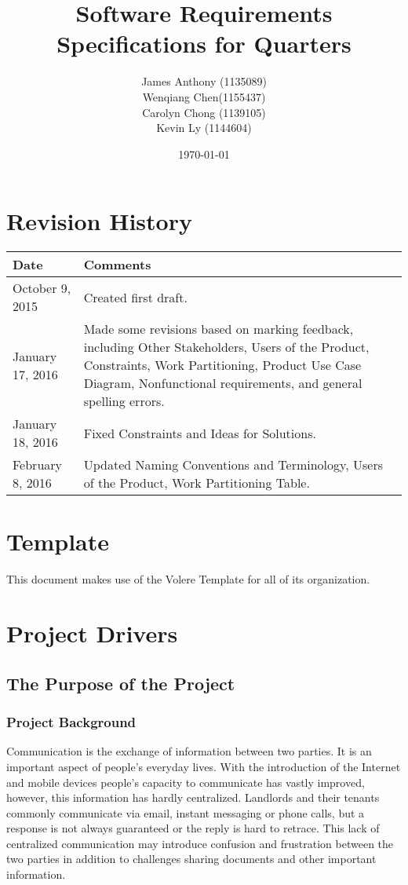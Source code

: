 \documentclass[12pt]{article}
\begin{document}
\title{Software Requirements Specifications for Quarters} 
\author{James Anthony (1135089)\\ Wenqiang Chen(1155437)\\ Carolyn Chong 
(1139105)\\ Kevin Ly (1144604)}
\date{\today}
\maketitle

\pagebreak

\tableofcontents 
\listoffigures
\listoftables

\section*{Revision History}
\begin{longtable}{|p{5cm}|p{10cm}|}
\hline
\textbf{Date}  & \textbf{Comments} \\ \hline
October 9, 2015 & Created first draft. \\ 
\hline
January 17, 2016 & Made some revisions based on marking feedback, including Other Stakeholders, Users of the Product, Constraints, Work Partitioning, Product Use Case Diagram, Nonfunctional requirements, and general spelling errors. \\ 
\hline
January 18, 2016 & Fixed Constraints and Ideas for Solutions. \\ 
\hline
February 8, 2016 & Updated Naming Conventions and Terminology, Users of the Product, Work Partitioning Table. \\ 
\hline
\end{longtable}

\section*{Template}
This document makes use of the Volere Template for all of its organization.

\pagebreak

\section{Project Drivers}
\subsection{The Purpose of the Project}
\subsubsection{Project Background}
Communication is the exchange of information between two parties. It is an important aspect of people's everyday lives. With the introduction 
of the Internet and mobile devices people's capacity to communicate has vastly 
improved, however, this information has hardly centralized. Landlords and their 
tenants commonly communicate via email, instant messaging or phone calls, but a response is not always guaranteed or the reply is hard to retrace. This lack of centralized 
communication may introduce confusion and frustration between the two parties in addition to challenges sharing documents and other important information.\\
\end{document}
